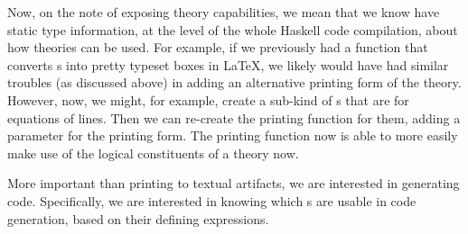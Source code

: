 Now, on the note of exposing theory capabilities, we mean that we know have
static type information, at the level of the whole Haskell code compilation,
about how theories can be used. For example, if we previously had a function
that converts \RelationConcept{}s into pretty typeset boxes in \LaTeX{}, we
likely would have had similar troubles (as discussed above) in adding an
alternative printing form of the theory. However, now, we might, for example,
create a sub-kind of \EquationalModel{}s that are for equations of lines. Then
we can re-create the printing function for them, adding a parameter for the
printing form. The printing function now is able to more easily make use of the
logical constituents of a theory now.

More important than printing to textual artifacts, we are interested in
generating code. Specifically, we are interested in knowing which
\EquationalModel{}s are usable in code generation, based on their defining
expressions.
